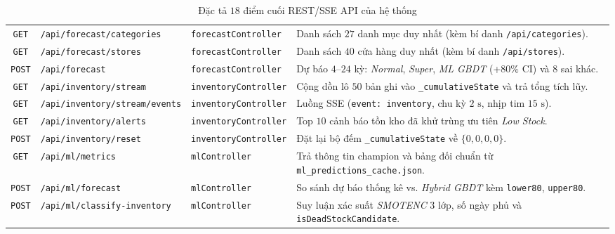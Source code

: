 \begin{table}[H]
\begin{tabular}{c l l p{5.5cm}}
		\texttt{GET}    & \texttt{/api/forecast/categories}        & \texttt{forecastController}  & Danh sách $27$ danh mục duy nhất (kèm bí danh \texttt{/api/categories}).                            \\
		\texttt{GET}    & \texttt{/api/forecast/stores}            & \texttt{forecastController}  & Danh sách $40$ cửa hàng duy nhất (kèm bí danh \texttt{/api/stores}).                                \\
		\texttt{POST}   & \texttt{/api/forecast}                   & \texttt{forecastController}  & Dự báo $4$--$24$ kỳ: \textit{Normal}, \textit{Super}, \textit{ML GBDT} (+$80\%$ CI) và $8$ sai khác. \\
		\texttt{GET}    & \texttt{/api/inventory/stream}           & \texttt{inventoryController} & Cộng dồn lô $50$ bản ghi vào \texttt{_cumulativeState} và trả tổng tích lũy.                       \\
		\texttt{GET}    & \texttt{/api/inventory/stream/events}    & \texttt{inventoryController} & Luồng SSE (\texttt{event: inventory}, chu kỳ $2\text{ s}$, nhịp tim $15\text{ s}$).                 \\
		\texttt{GET}    & \texttt{/api/inventory/alerts}           & \texttt{inventoryController} & Top $10$ cảnh báo tồn kho đã khử trùng ưu tiên \textit{Low Stock}.                                  \\
		\texttt{POST}   & \texttt{/api/inventory/reset}            & \texttt{inventoryController} & Đặt lại bộ đếm \texttt{_cumulativeState} về $\{0, 0, 0, 0\}$.                                      \\
		\texttt{GET}    & \texttt{/api/ml/metrics}                 & \texttt{mlController}        & Trả thông tin champion và bảng đối chuẩn từ \texttt{ml_predictions_cache.json}.                   \\
		\texttt{POST}   & \texttt{/api/ml/forecast}                & \texttt{mlController}        & So sánh dự báo thống kê vs. \textit{Hybrid GBDT} kèm \texttt{lower80}, \texttt{upper80}.           \\
		\texttt{POST}   & \texttt{/api/ml/classify-inventory}      & \texttt{mlController}        & Suy luận xác suất \textit{SMOTENC} $3$ lớp, số ngày phủ và \texttt{isDeadStockCandidate}.          \\
		\bottomrule
	\end{tabular}
	\caption{Đặc tả $18$ điểm cuối REST/SSE API của hệ thống}
	\label{tab:api-spec}
\end{table}

